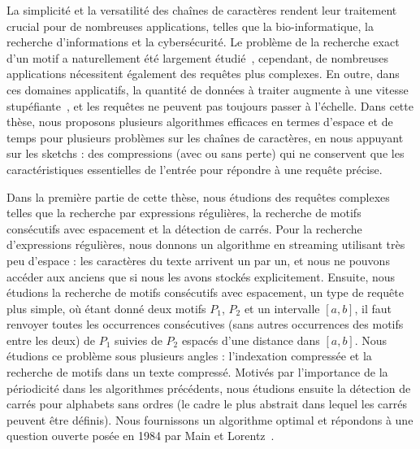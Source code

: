 La simplicité et la versatilité des chaînes de caractères rendent leur traitement crucial pour de nombreuses applications, telles que la bio-informatique, la recherche d'informations et la cybersécurité.
Le problème de la recherche exact d'un motif a naturellement été largement étudié~\cite{Charras2004}, cependant, de nombreuses applications nécessitent également des requêtes plus complexes. En outre, dans ces domaines applicatifs, la quantité de données à traiter augmente à une vitesse stupéfiante~\cite{muir2016real}, et les requêtes ne peuvent pas toujours passer à l'échelle.
Dans cette thèse, nous proposons plusieurs algorithmes efficaces en termes d'espace et de temps pour plusieurs problèmes sur les chaînes de caractères, en nous appuyant sur les sketchs : des compressions (avec ou sans perte) qui ne conservent que les caractéristiques essentielles de l'entrée pour répondre à une requête précise.

Dans la première partie de cette thèse, nous étudions des requêtes complexes telles que la recherche par expressions régulières, la recherche de motifs consécutifs avec espacement et la détection de carrés.
Pour la recherche d'expressions régulières, nous donnons un algorithme en streaming utilisant très peu d'espace : les caractères du texte arrivent un par un, et nous ne pouvons accéder aux anciens que si nous les avons stockés explicitement.
Ensuite, nous étudions la recherche de motifs consécutifs avec espacement, un type de requête plus simple, où étant donné deux motifs $P_1$, $P_2$ et un intervalle $[a, b]$, il faut renvoyer toutes les occurrences consécutives (sans autres occurrences des motifs entre les deux) de $P_1$ suivies  de $P_2$ espacés d'une distance dans $[a, b]$. Nous étudions ce problème sous plusieurs angles : l'indexation compressée et la recherche de motifs dans un texte compressé.
Motivés par l'importance de la périodicité dans les algorithmes précédents, nous étudions ensuite la détection de carrés pour alphabets sans ordres (le cadre le plus abstrait dans lequel les carrés peuvent être définis). Nous fournissons un algorithme optimal et répondons à une question ouverte posée en 1984 par Main et Lorentz~\cite{Main1984}.

